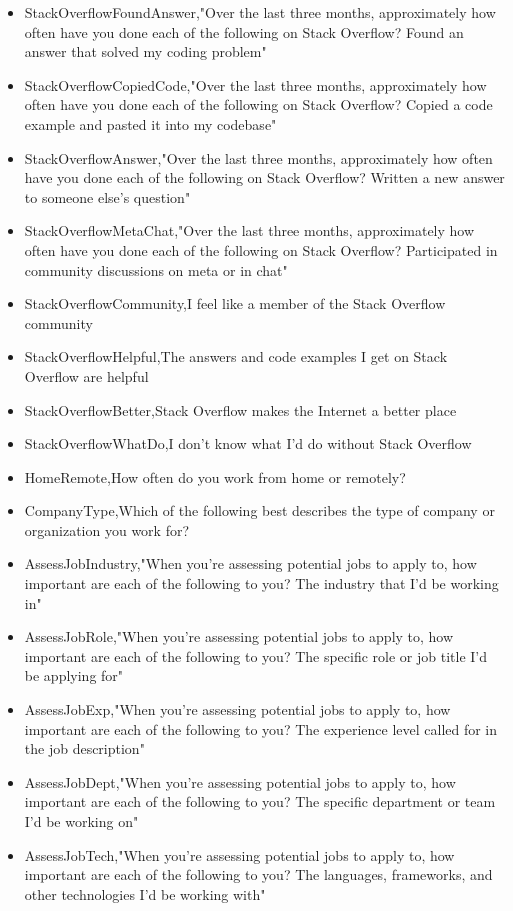 \begin{appendices}
\begin{itemize}
        \item StackOverflowFoundAnswer,"Over the last three months, approximately how often have you done each of the following on Stack Overflow? Found an answer that solved my coding problem"
        \item StackOverflowCopiedCode,"Over the last three months, approximately how often have you done each of the following on Stack Overflow? Copied a code example and pasted it into my codebase"
        \item StackOverflowAnswer,"Over the last three months, approximately how often have you done each of the following on Stack Overflow? Written a new answer to someone else's question"
        \item StackOverflowMetaChat,"Over the last three months, approximately how often have you done each of the following on Stack Overflow? Participated in community discussions on meta or in chat"
        \item StackOverflowCommunity,I feel like a member of the Stack Overflow community
        \item StackOverflowHelpful,The answers and code examples I get on Stack Overflow are helpful
        \item StackOverflowBetter,Stack Overflow makes the Internet a better place
        \item StackOverflowWhatDo,I don't know what I'd do without Stack Overflow
        \item HomeRemote,How often do you work from home or remotely?
        \item CompanyType,Which of the following best describes the type of company or organization you work for?
        \item AssessJobIndustry,"When you're assessing potential jobs to apply to, how important are each of the following to you? The industry that I'd be working in"
        \item AssessJobRole,"When you're assessing potential jobs to apply to, how important are each of the following to you? The specific role or job title I'd be applying for"
        \item AssessJobExp,"When you're assessing potential jobs to apply to, how important are each of the following to you? The experience level called for in the job description"
        \item AssessJobDept,"When you're assessing potential jobs to apply to, how important are each of the following to you? The specific department or team I'd be working on"
        \item AssessJobTech,"When you're assessing potential jobs to apply to, how important are each of the following to you? The languages, frameworks, and other technologies I'd be working with"

\end{itemize}
\end{appendices}
